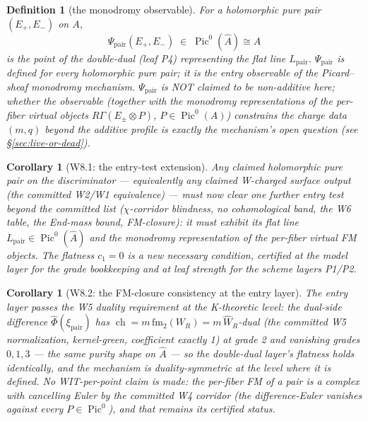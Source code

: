 \documentclass[11pt]{article}
\newtheorem{corollary}[lemma]{Corollary}
\newtheorem{definition}[lemma]{Definition}
\newcommand{\WR}{W_R}
\newcommand{\ch}{\operatorname{ch}}
\newcommand{\Pic}{\operatorname{Pic}}
\newcommand{\KA}{A}
\newcommand{\KAd}{\widehat{A}}
\begin{document}
\begin{definition}[the monodromy observable]
\label{def:Psi}
For a holomorphic pure pair $(E_+,E_-)$ on $\KA$,
\[
\Psi_{\mathrm{pair}}(E_+,E_-) \;\in\; \Pic^0(\KAd) \cong \KA
\]
is the point of the double-dual (leaf P4) representing the flat line
$L_{\mathrm{pair}}$. $\Psi_{\mathrm{pair}}$ is defined for every
holomorphic pure pair; it is the entry observable of the Picard--sheaf
monodromy mechanism. $\Psi_{\mathrm{pair}}$ is NOT claimed to be
non-additive here; whether the observable (together with the monodromy
representations of the per-fiber virtual objects
$R\Gamma(E_\pm\otimes P)$, $P\in\Pic^0(\KA)$) constrains the charge data
$(m,q)$ beyond the additive profile is exactly the mechanism's open
question (see \S\ref{sec:live-or-dead}).
\end{definition}

\begin{corollary}[W8.1: the entry-test extension]
\label{cor:W81}
Any claimed holomorphic pure pair on the discriminator --- equivalently any
claimed W-charged surface output (the committed W2/W1 equivalence) --- must
now clear one further entry test beyond the committed list
($\chi$-corridor blindness, no cohomological band, the W6 table, the End-mass
bound, FM-closure): it must exhibit its flat line
$L_{\mathrm{pair}}\in\Pic^0(\KAd)$ and the monodromy representation of the
per-fiber virtual FM objects. The flatness $c_1 = 0$ is a new necessary
condition, certified at the model layer for the grade bookkeeping and at
leaf strength for the scheme layers P1/P2.
\end{corollary}

\begin{corollary}[W8.2: the FM-closure consistency at the entry layer]
\label{cor:W82}
The entry layer passes the W5 duality requirement at the K-theoretic level:
the dual-side difference $\widehat\Phi(\xi_{\mathrm{pair}})$ has
$\ch = m\,\mathrm{fm}_2(\WR) = m\,\widehat\WR$-dual (the committed W5
normalization, kernel-green, coefficient exactly 1) at grade 2 and
vanishing grades $0,1,3$ --- the same purity shape on $\KAd$ --- so the
double-dual layer's flatness holds identically, and the mechanism is
duality-symmetric at the level where it is defined. No WIT-per-point claim
is made: the per-fiber FM of a pair is a complex with cancelling Euler by
the committed W4 corridor (the difference-Euler vanishes against every
$P\in\Pic^0$), and that remains its certified status.
\end{corollary}
\end{document}
